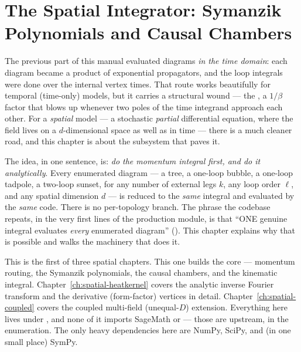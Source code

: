 \chapter{The Spatial Integrator: Symanzik Polynomials and Causal Chambers}\label{ch:spatial-core}

The previous part of this manual evaluated diagrams \emph{in the time domain}:
each diagram became a product of exponential propagators, and the loop integrals
were done over the internal vertex times. That route works beautifully for
temporal (time-only) models, but it carries a structural wound --- the
, a $1/\beta$ factor that blows up whenever two poles
of the time integrand approach each other. For a \emph{spatial} model --- a
stochastic \emph{partial} differential equation, where the field lives on a
$d$-dimensional space as well as in time --- there is a much cleaner road, and
this chapter is about the subsystem that paves it.

The idea, in one sentence, is: \emph{do the momentum integral first, and do it
analytically}. Every enumerated diagram --- a tree, a one-loop bubble, a one-loop
tadpole, a two-loop sunset, for any number of external legs $k$, any loop order
$\ell$, and any spatial dimension $d$ --- is reduced to the \emph{same} integral
and evaluated by the \emph{same} code. There is no per-topology branch. The
phrase the codebase repeats, in the very first lines of the production module, is
that ``ONE genuine integral evaluates \emph{every} enumerated diagram''
(). This chapter explains
why that is possible and walks the machinery that does it.

\begin{note}
This is the first of three spatial chapters. This one builds the core ---
momentum routing, the Symanzik polynomials, the causal chambers, and the kinematic
integral. Chapter~\ref{ch:spatial-heatkernel} covers the analytic
inverse Fourier transform and the derivative (form-factor) vertices in detail.
Chapter~\ref{ch:spatial-coupled} covers the coupled multi-field (unequal-$D$)
extension. Everything here lives under
, and none of it imports SageMath or
 --- those are upstream, in the enumeration. The only heavy
dependencies here are NumPy, SciPy, and (in one small place) SymPy.
\end{note}

